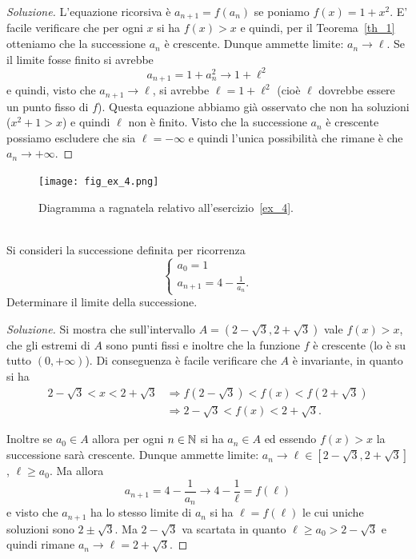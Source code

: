 \begin{proof}[Soluzione]
  L'equazione ricorsiva è $a_{n+1}=f(a_n)$ se poniamo $f(x) = 1+x^2$.
  E' facile verificare che per ogni $x$ si ha $f(x) > x$ e quindi, per
  il Teorema~\ref{th_1} otteniamo che la successione $a_n$ è
  crescente. Dunque ammette limite: $a_n \to \ell$. Se il limite fosse
  finito si avrebbe
  \[
  a_{n+1} = 1 + a_n^2 \to 1 + \ell^2
  \]
  e quindi, visto che $a_{n+1}\to \ell$, si avrebbe $\ell = 1 +
  \ell^2$ (cioè $\ell$ dovrebbe essere un punto fisso di $f$). Questa
  equazione abbiamo già osservato che non ha soluzioni ($x^2 + 1 > x$)
  e quindi $\ell$ non è finito. Visto che la successione $a_n$ è
  crescente possiamo escludere che sia $\ell=-\infty$ e quindi l'unica
  possibilità che rimane è che $a_n \to +\infty$.
\end{proof}

\newsavebox{\qrexquattro}
\begin{figure}
  \begin{center}
  \texttt{[image: fig\_ex\_4.png]}
  \end{center}
  \caption{Diagramma a ragnatela relativo
    all'esercizio~\ref{ex_4}.\\\\
    \usebox{\qrexquattro}
    }
  \label{fig_ex_4}
\end{figure}

\begin{exercise}\label{ex_4}
  Si consideri la successione definita per ricorrenza
  \[
  \begin{cases}
    a_0 = 1\\
    a_{n+1} =4-\frac 1 {a_n}.
  \end{cases}
  \]
  Determinare il limite della successione.
\end{exercise}

\begin{proof}[Soluzione]
  Si mostra che sull'intervallo $A=(2-\sqrt 3, 2+\sqrt 3)$
  vale $f(x)>x$, che gli estremi di $A$ sono punti fissi
  e inoltre che la funzione $f$ è crescente (lo è su tutto $(0,+\infty)$).
  Di conseguenza è facile verificare che $A$ è invariante, in quanto si ha
  \begin{align*}
  2-\sqrt 3 < x < 2+\sqrt 3 &\Rightarrow
  f(2-\sqrt 3) < f(x) < f(2+\sqrt 3)\\
  &\Rightarrow
  2-\sqrt 3 < f(x) < 2+\sqrt 3.
  \end{align*}

  Inoltre se $a_0 \in A$ allora per ogni $n\in{\mathbb N}$ si ha $a_n\in A$ ed essendo
  $f(x)>x$ la successione sarà crescente. Dunque ammette
  limite: $a_n \to \ell \in [2-\sqrt 3,2+\sqrt 3]$, $\ell \ge a_0$.
  Ma allora
  \[
  a_{n+1} = 4-\frac 1 {a_n} \to 4 - \frac 1 \ell = f(\ell)
  \]
  e visto che $a_{n+1}$ ha lo stesso limite di $a_n$ si ha $\ell =
  f(\ell)$ le cui uniche soluzioni sono $2\pm \sqrt 3$. Ma $2-\sqrt 3$
  va scartata in quanto $\ell\ge a_0 > 2-\sqrt 3$ e quindi rimane
  $a_n \to \ell = 2+\sqrt 3$.
\end{proof}

